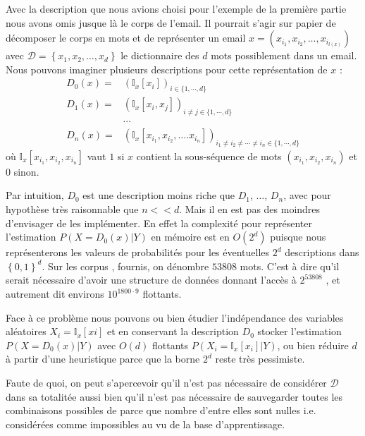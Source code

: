 \documentclass[a4paper, french]{article}
\begin{document}
Avec la description que nous avions choisi pour l'exemple de la premi\`ere partie 
nous avons omis jusque l\`a le corps de l'email. Il pourrait s'agir sur papier de 
d\'ecomposer le corps en mots et de repr\'esenter un email 
$x=\left(x_{i_1},x_{i_2},\ldots,x_{i_{l(x)}}\right)$ 
avec $\mathcal{D}=\left\{x_1,x_2,\ldots,x_d\right\}$ le dictionnaire des $d$ 
mots possiblement dans un email. Nous pouvons imaginer plusieurs descriptions pour
cette repr\'esentation de $x$ :
\begin{align*}
    \label{eq:description_vect}
    D_0(x) = &\left(\mathbb{I}_x[x_{i}]\right)_{i\in\{1,\cdots,d\}}\\
    D_1(x) = &\left(\mathbb{I}_x[x_{i},x_{j}]\right)_{i\neq j\in\{1,\cdots,d\}}\\
             &\cdots\\
    D_n(x) = &\left(\mathbb{I}_x[x_{i_1},x_{i_2},\ldots.x_{i_n}]\right)%
    _{i_1\neq i_2\neq \cdots \neq i_n\in\{1,\cdots,d\}}
\end{align*}
o\`u $\mathbb{I}_x[x_{i_1},x_{i_2},x_{i_n}]$ vaut $1$ si $x$ contient 
la sous-s\'equence de mots $(x_{i_1},x_{i_2},x_{i_n})$ et $0$ sinon.

Par intuition, $D_0$ est une description moins riche que $D_1$, $\ldots$, 
$D_n$, avec pour hypoth\`ese tr\`es raisonnable que $n<<d$.
Mais il en est pas des moindres d'envisager de les impl\'ementer.
En effet la complexit\'e pour repr\'esenter l'estimation $P(X=D_0(x)|Y)$ 
en m\'emoire est en $O(2^d)$ puisque nous repr\'esenterons les valeurs de
probabilit\'es pour les \'eventuelles $2^d$ descriptions dans 
$\left\{0,1\right\}^d$. Sur les corpus ,  
fournis, on d\'enombre $53808$ mots. C'est \`a dire qu'il serait n\'ecessaire
d'avoir une structure de donn\'ees donnant l'acc\`es \`a $2^{53808}$ 
, et autrement dit environs $10^{1800\cdot9}$ flottants.

Face \`a ce probl\`eme nous pouvons ou bien \'etudier 
l'ind\'ependance des variables al\'eatoires $X_i=\mathbb{I}_x[xi]$ 
et en conservant la description $D_0$ stocker l'estimation $P(X=D_0(x)|Y)$
avec $O(d)$ flottants $P(X_i=\mathbb{I}_x[x_i]|Y)$, ou bien r\'eduire $d$
\`a partir d'une heuristique parce que la borne $2^d$ reste tr\`es pessimiste.

Faute de quoi, on peut s'apercevoir qu'il n'est pas n\'ecessaire de
consid\'erer $\mathcal{D}$ dans sa totalit\'ee aussi bien qu'il n'est pas
n\'ecessaire de sauvegarder toutes les combinaisons possibles de parce que
nombre d'entre elles sont nulles i.e. consid\'er\'ees comme impossibles au vu
de la base d'apprentissage.
\end{document}
